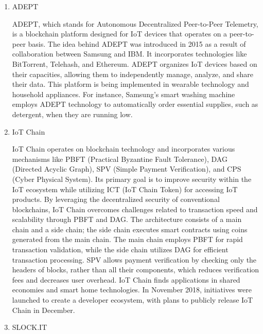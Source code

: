 \documentclass[conference]{IEEEtran}
\begin{document}
\begin{enumerate}[itemsep=2ex, parsep=1ex]
	\item ADEPT
	      	      	      
	      ADEPT, which stands for Autonomous Decentralized Peer-to-Peer Telemetry,
	      is a blockchain platform designed for IoT devices that operates on a peer-to-peer
	      basis. The idea behind ADEPT was introduced in 2015 as a result of collaboration
	      between Samsung and IBM. It incorporates technologies like BitTorrent, Telehash,
	      and Ethereum. ADEPT organizes IoT devices based on their capacities,
	      allowing them to independently manage, analyze, and share their data. This
	      platform is being implemented in wearable technology and household appliances.
	      For instance, Samsung's smart washing machine employs ADEPT technology to automatically
	      order essential supplies, such as detergent, when they are running low.
	      	      	      
	\item IoT Chain
	      	      	      
	      IoT Chain operates on blockchain technology and incorporates various
	      mechanisms like PBFT (Practical Byzantine Fault Tolerance), DAG (Directed
	      Acyclic Graph), SPV (Simple Payment Verification), and CPS (Cyber Physical
	      System). Its primary goal is to improve security within the IoT ecosystem
	      while utilizing ICT (IoT Chain Token) for accessing IoT products. By leveraging
	      the decentralized security of conventional blockchains, IoT Chain
	      overcomes challenges related to transaction speed and scalability through
	      PBFT and DAG. The architecture consists of a main chain and a side chain;
	      the side chain executes smart contracts using coins generated from the
	      main chain. The main chain employs PBFT for rapid transaction validation,
	      while the side chain utilizes DAG for efficient transaction processing. SPV
	      allows payment verification by checking only the headers of blocks, rather
	      than all their components, which reduces verification fees and decreases user
	      overhead. IoT Chain finds applications in shared economies and smart home
	      technologies. In November 2018, initiatives were launched to create a
	      developer ecosystem, with plans to publicly release IoT Chain in December.
	      	      	      
	\item SLOCK.IT
	      	      	      

\end{enumerate}
\end{document}
